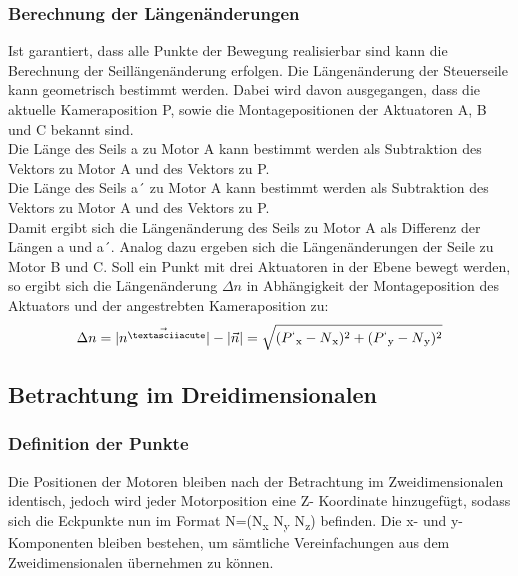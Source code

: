 \documentclass[a4paper, 12pt]{article}
\begin{document}
			\subsubsection{Berechnung der Längenänderungen}
			Ist garantiert, dass alle Punkte der Bewegung realisierbar sind kann die Berechnung der Seillängenänderung erfolgen. 
			Die Längenänderung der Steuerseile kann geometrisch bestimmt werden.
			Dabei wird davon ausgegangen, dass die aktuelle Kameraposition P, sowie die Montagepositionen der Aktuatoren A, B und C bekannt sind.\\
			Die Länge des Seils a zu Motor A kann bestimmt werden als Subtraktion des Vektors zu Motor A und des Vektors zu P.\\
			Die Länge des Seils a´ zu Motor A kann bestimmt werden als Subtraktion des Vektors zu Motor A und des Vektors zu P.\\
			Damit ergibt sich die Längenänderung des Seils zu Motor A als Differenz der Längen a und a´.
			Analog dazu ergeben sich die Längenänderungen der Seile zu Motor B und C.
			Soll ein Punkt mit drei Aktuatoren in der Ebene bewegt werden,
			so ergibt sich die Längenänderung $\Delta n$ in Abhängigkeit der Montageposition des Aktuators und der angestrebten Kameraposition zu:
			\begin{align}
				\Delta n =
				|\vec{n^{´}}|-|\vec{n}|=
				\sqrt{
				(P^{`}\textsubscript{x}-N\textsubscript{x})^2+
				(P^{`}\textsubscript{y}-N\textsubscript{y})^2
				}
			\end{align}
		\subsection{Betrachtung im Dreidimensionalen}
			\subsubsection{Definition der Punkte}
			Die Positionen der Motoren bleiben nach der Betrachtung im Zweidimensionalen identisch, jedoch wird jeder Motorposition eine Z- Koordinate hinzugefügt, sodass sich die Eckpunkte nun im Format N=(N\textsubscript{x} N\textsubscript{y} N\textsubscript{z}) befinden. Die x- und y- Komponenten bleiben bestehen, um sämtliche Vereinfachungen aus dem Zweidimensionalen übernehmen zu können. 
\end{document}
